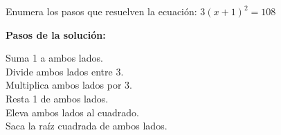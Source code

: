 Enumera los pasos que resuelven la ecuación: $3(x+1)^2=108$

\textbf{Pasos de la solución:}

\fillin[-][0.5cm] Suma 1 a ambos lados.\\
\fillin[1][0.5cm] Divide ambos lados entre 3.\\
\fillin[-][0.5cm] Multiplica ambos lados por 3.\\
\fillin[3][0.5cm] Resta 1 de ambos lados.\\
\fillin[-][0.5cm] Eleva ambos lados al cuadrado.\\
\fillin[2][0.5cm] Saca la raíz cuadrada de ambos lados.\\

